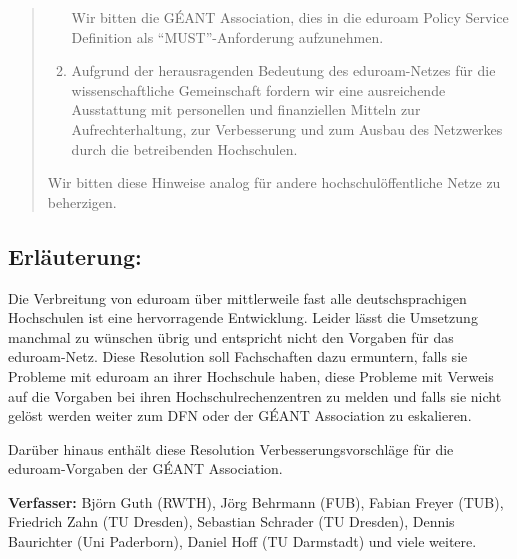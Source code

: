 \documentclass[10pt,oneside]{scrartcl}
\begin{document}
\begin{quote}
\begin{enumerate}
    Wir bitten die GÉANT Association, dies in die eduroam Policy Service Definition
    als ``MUST''-Anforderung aufzunehmen.

  \item Aufgrund der herausragenden Bedeutung des eduroam-Netzes für die
    wissenschaftliche Gemeinschaft fordern wir eine ausreichende Ausstattung mit
    personellen und finanziellen Mitteln zur Aufrechterhaltung, zur Verbesserung
    und zum Ausbau des Netzwerkes durch die betreibenden Hochschulen.
  \end{enumerate}

  Wir bitten diese Hinweise analog für andere hochschulöffentliche Netze zu
  beherzigen.

\end{quote}

\subsection*{Erläuterung:}

Die Verbreitung von eduroam über mittlerweile fast alle deutschsprachigen Hochschulen ist
eine hervorragende Entwicklung. Leider lässt die Umsetzung manchmal zu wünschen
übrig und entspricht nicht den Vorgaben für das eduroam-Netz. Diese Resolution
soll Fachschaften dazu ermuntern, falls sie Probleme mit eduroam an ihrer
Hochschule haben, diese Probleme mit Verweis auf die Vorgaben bei ihren
Hochschulrechenzentren zu melden und falls sie nicht gelöst werden weiter zum DFN
oder der GÉANT Association zu eskalieren.

Darüber hinaus enthält diese Resolution Verbesserungsvorschläge für die
eduroam-Vorgaben der GÉANT Association.

\vspace{1cm}
\textbf{Verfasser:} Björn Guth (RWTH), Jörg Behrmann (FUB), Fabian Freyer (TUB),
Friedrich Zahn (TU Dresden), Sebastian Schrader (TU Dresden), Dennis Baurichter (Uni Paderborn),
Daniel Hoff (TU Darmstadt) und viele weitere.
\end{document}
